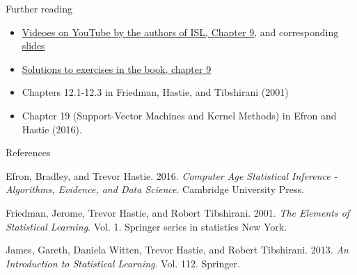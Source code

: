 \documentclass[10pt,ignorenonframetext,]{beamer}
\begin{document}
\begin{frame}{Further reading}

\begin{itemize}
\item
  \href{https://www.youtube.com/playlist?list=PL5-da3qGB5IDl6MkmovVdZwyYOhpCxo5o}{Videoes
  on YouTube by the authors of ISL, Chapter 9}, and corresponding
  \href{https://lagunita.stanford.edu/c4x/HumanitiesScience/StatLearning/asset/svm.pdf}{slides}
\item
  \href{https://rpubs.com/ppaquay/65566}{Solutions to exercises in the
  book, chapter 9}
\item
  Chapters 12.1-12.3 in Friedman, Hastie, and Tibshirani (2001)
\item
  Chapter 19 (Support-Vector Machines and Kernel Methods) in Efron and
  Hastie (2016).
\end{itemize}

\end{frame}

\begin{frame}{References}

\hypertarget{refs}{}
\hypertarget{ref-casi}{}
Efron, Bradley, and Trevor Hastie. 2016. \emph{Computer Age Statistical
Inference - Algorithms, Evidence, and Data Science}. Cambridge
University Press.

\hypertarget{ref-ESL}{}
Friedman, Jerome, Trevor Hastie, and Robert Tibshirani. 2001. \emph{The
Elements of Statistical Learning}. Vol. 1. Springer series in statistics
New York.

\hypertarget{ref-ISL}{}
James, Gareth, Daniela Witten, Trevor Hastie, and Robert Tibshirani.
2013. \emph{An Introduction to Statistical Learning}. Vol. 112.
Springer.

\end{frame}
\end{document}
